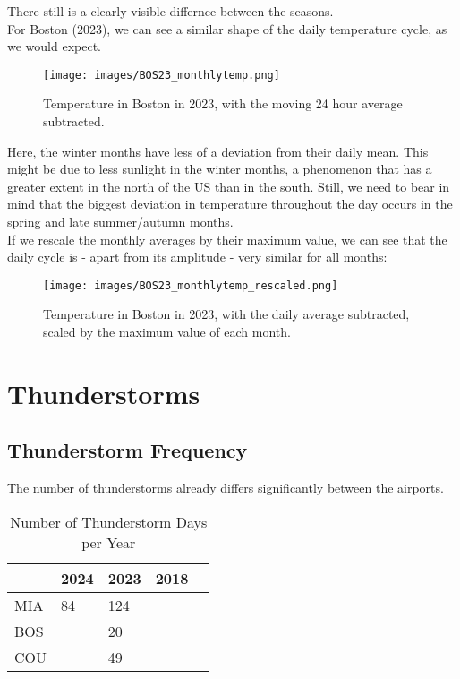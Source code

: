 \documentclass[12pt, parskip=half]{scrartcl}
\begin{document}
There still is a clearly visible differnce between the seasons.\\

For Boston (2023), we can see a similar shape of the daily temperature cycle, as we would expect.

\begin{figure}[!h]
\centering
\texttt{[image: images/BOS23\_monthlytemp.png]}
\caption{Temperature in Boston in 2023, with the moving 24 hour average subtracted.}
\end{figure}

Here, the winter months have less of a deviation from their daily mean.
This might be due to less sunlight in the winter months, a phenomenon that has a greater extent in the north of the US than in the south.
Still, we need to bear in mind that the biggest deviation in temperature throughout the day occurs in the spring and late summer/autumn months.\\

If we rescale the monthly averages by their maximum value, we can see that the daily cycle is - apart from its amplitude - very similar for all months:
\begin{figure}[!h]
\centering
\texttt{[image: images/BOS23\_monthlytemp\_rescaled.png]}
\caption{Temperature in Boston in 2023, with the daily average subtracted, scaled by the maximum value of each month.}
\end{figure}



\section{Thunderstorms}
\subsection{Thunderstorm Frequency}
The number of thunderstorms already differs significantly between the airports.

\begin{table}[!h]
\caption{Number of Thunderstorm Days per Year}
\begin{tabular}{l|l|l|l|l}
 & 2024 & 2023 & 2018 &   \\ \hline
MIA & 84 & 124 &  & \\ \hline
BOS &  & 20 &  &  \\ \hline 
COU &  & 49 &  &  
\end{tabular}
\end{table}
\end{document}
